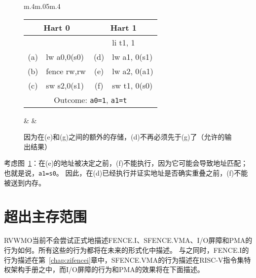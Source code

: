 \begin{figure}[h!]
  \centering
  \begin{tabular}{m{.4\linewidth}m{.05\linewidth}m{.4\linewidth}}
    \tt\small
    \begin{tabular}{cl||cl}
    \multicolumn{2}{c}{Hart 0} & \multicolumn{2}{c}{Hart 1} \\
    \hline
        &             &     & li t1, 1       \\
    (a) & lw a0,0(s0) & (d) & lw a1, 0(s1)   \\
    (b) & fence rw,rw & (e) & lw a2, 0(a1)   \\
    (c) & sw s2,0(s1) & (f) & sw t1, 0(s0)   \\
    \hline
    \multicolumn{4}{c}{Outcome: {\tt a0=1}, {\tt a1=t}}
    \end{tabular}  
    & &
    
  \end{tabular}
  \caption{因为在(e)和(g)之间的额外的存储，(d)不再必须先于(g)了（允许的输出结果）
    }
  \label{fig:litmus:addrpo}
\end{figure}

考虑图~\ref{fig:litmus:addrpo}：在(e)的地址被决定之前，(f)不能执行，因为它可能会导致地址匹配；也就是说，{\tt a1=s0}。
因此，在(d)已经执行并证实地址是否确实重叠之前，(f)不能被送到内存。

\section{超出主存范围}

RVWMO当前不会尝试正式地描述FENCE.I、SFENCE.VMA、I/O屏障和PMA的行为如何。所有这些的行为都将在未来的形式化中描述。
与之同时，FENCE.I的行为描述在第~\ref{chap:zifencei}章中，SFENCE.VMA的行为描述在RISC-V指令集特权架构手册之中，而I/O屏障的行为和PMA的效果将在下面描述。

